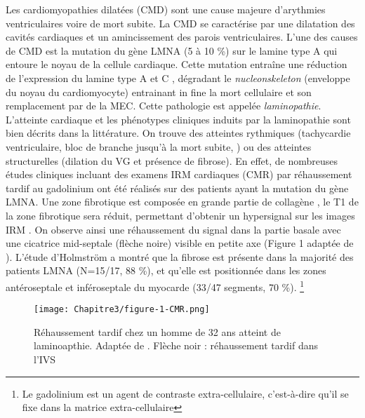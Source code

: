 Les cardiomyopathies dilatées (CMD) sont une cause majeure d’arythmies ventriculaires voire de mort subite. La CMD se caractérise par une dilatation des cavités cardiaques et un amincissement des parois ventriculaires. L’une des causes de CMD est la mutation du gène LMNA (5 à 10 \%) sur le lamine type A qui entoure le noyau de la cellule cardiaque. Cette mutation entraîne une réduction de l’expression du lamine type A et C \cite{AlSaaidi2013}, dégradant le \textit{nucleonskeleton} (enveloppe du noyau du cardiomyocyte) entrainant in fine la mort cellulaire et son remplacement par de la MEC. Cette pathologie est appelée \textit{laminopathie}. 
\\
L’atteinte cardiaque et les phénotypes cliniques induits par la laminopathie sont bien décrits dans la littérature. On trouve des atteintes rythmiques (tachycardie ventriculaire, bloc de branche jusqu’à la mort subite, \cite{durandviel:dumas-01219976}) ou des atteintes structurelles (dilation du VG et présence de fibrose). En effet, de nombreuses études cliniques incluant des examens IRM cardiaques (CMR) par réhaussement tardif au gadolinium ont été réalisés sur des patients ayant la mutation du gène LMNA. Une zone fibrotique est composée en grande partie de collagène \cite{Caravan2006}, le T1 de la zone fibrotique sera réduit, permettant d’obtenir un hypersignal sur les images IRM \cite{Caravan2006}. On observe ainsi une réhaussement du signal dans la partie basale avec une cicatrice mid-septale (flèche noire) visible en petite axe (Figure 1 adaptée de \cite{Holmstrm2011}). L’étude d’Holmström a montré que la fibrose est présente dans la majorité des patients LMNA (N=15/17, 88 \%), et qu’elle est positionnée dans les zones antéroseptale et inféroseptale du myocarde (33/47 segments, 70 \%). \footnote{Le gadolinium est un agent de contraste extra-cellulaire, c’est-à-dire qu’il se fixe dans la matrice extra-cellulaire }

\begin{figure}[!ht]
  \begin{center}
    \texttt{[image: Chapitre3/figure-1-CMR.png]}
  \end{center}
  \caption{Réhaussement tardif chez un homme de 32 ans atteint de laminoapthie. Adaptée de \cite{Holmstrm2011}. Flèche noir : réhaussement tardif dans l’IVS}
  \label{fig:gado_LMNA}
\end{figure}

